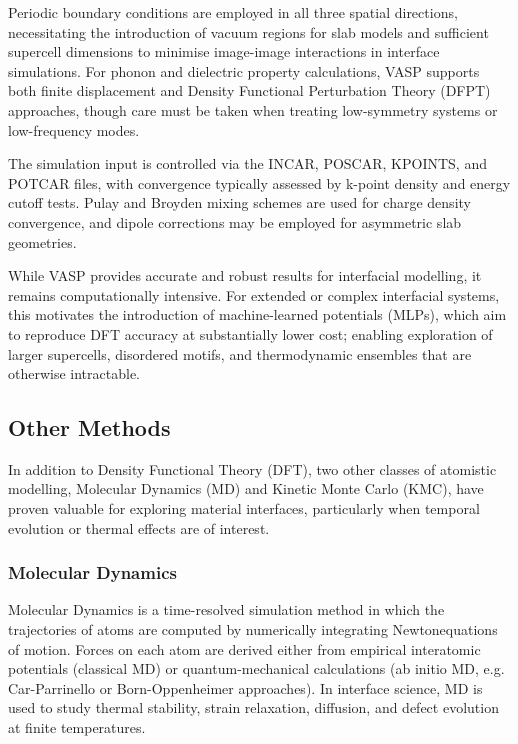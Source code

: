 Periodic boundary conditions are employed in all three spatial directions, necessitating the introduction of vacuum regions for slab models and sufficient supercell dimensions to minimise image-image interactions in interface simulations. For phonon and dielectric property calculations, VASP supports both finite displacement and Density Functional Perturbation Theory (DFPT) approaches, though care must be taken when treating low-symmetry systems or low-frequency modes. 
 
The simulation input is controlled via the INCAR, POSCAR, KPOINTS, and POTCAR files, with convergence typically assessed by k-point density and energy cutoff tests. Pulay and Broyden mixing schemes are used for charge density convergence, and dipole corrections may be employed for asymmetric slab geometries. 
 
While VASP provides accurate and robust results for interfacial modelling, it remains computationally intensive. For extended or complex interfacial systems, this motivates the introduction of machine-learned potentials (MLPs), which aim to reproduce DFT accuracy at substantially lower cost; enabling exploration of larger supercells, disordered motifs, and thermodynamic ensembles that are otherwise intractable. 
 
\subsection{Other Methods} 
 
In addition to Density Functional Theory (DFT), two other classes of atomistic modelling, Molecular Dynamics (MD) and Kinetic Monte Carlo (KMC), have proven valuable for exploring material interfaces, particularly when temporal evolution or thermal effects are of interest. 
 
\subsubsection{Molecular Dynamics} 
 
Molecular Dynamics is a time-resolved simulation method in which the trajectories of atoms are computed by numerically integrating Newton\rqss equations of motion. Forces on each atom are derived either from empirical interatomic potentials (classical MD) or quantum-mechanical calculations (ab initio MD, e.g. Car-Parrinello or Born-Oppenheimer approaches). In interface science, MD is used to study thermal stability, strain relaxation, diffusion, and defect evolution at finite temperatures. 
 
